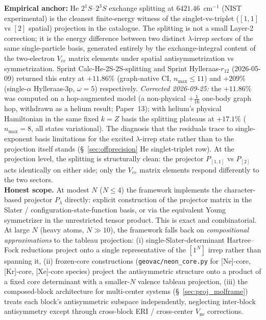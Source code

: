 \documentclass[11pt]{article}
\begin{document}
\textbf{Empirical anchor:} He $2^1 S$--$2^3 S$ exchange splitting at
$6421.46$~cm$^{-1}$ (NIST experimental) is the cleanest finite-energy
witness of the singlet-vs-triplet ($[1,1]$ vs $[2]$ spatial)
projection in the catalogue.  The splitting is not a small Layer-2
correction; it is the energy difference between two distinct
$\lambda$-irrep sectors of the same single-particle basis, generated
entirely by the exchange-integral content of the two-electron $V_{ee}$
matrix elements under spatial antisymmetrization vs symmetrization.
Sprint Calc-He-2S-2S-splitting and Sprint Hylleraas-$r_{12}$
(2026-05-09) returned this entry at $+11.86\%$ (graph-native CI,
$n_{\max} \leq 11$) and $+209\%$ (single-$\alpha$ Hylleraas-3p,
$\omega = 5$) respectively.  \emph{Corrected 2026-09-25:} the
$+11.86\%$ was computed on a hop-augmented model (a non-physical
$+\tfrac{1}{16}$ one-body graph hop, withdrawn as a helium result;
Paper~13); with helium's physical Hamiltonian in the same fixed
$k = Z$ basis the splitting plateaus at $+17.1\%$ ($n_{\max} = 8$,
all states variational).  The diagnosis that the residuals
trace to single-exponent basis limitations for the excited
$\lambda$-irrep state rather than to the projection itself stands
(\S~\ref{sec:offprecision} He singlet-triplet row).  At the
projection level, the splitting is structurally clean: the projector
$P_{[1,1]}$ vs $P_{[2]}$ acts identically on either side; only the
$V_{ee}$ matrix elements respond differently to the two sectors.\\
\textbf{Honest scope.}  At modest $N$ ($N \leq 4$) the framework
implements the character-based projector $P_\lambda$ directly:
explicit construction of the projector matrix in the Slater /
configuration-state-function basis, or via the equivalent Young
symmetrizer in the unrestricted tensor product.  This is exact and
combinatorial.  At large $N$ (heavy atoms, $N \gg 10$), the framework
falls back on \emph{compositional approximations} to the tableau
projection: (i) single-Slater-determinant Hartree--Fock reductions
project onto a single representative of the $[1^N]$ irrep rather
than spanning it, (ii) frozen-core constructions
(\texttt{geovac/neon\_core.py} for [Ne]-core, [Kr]-core, [Xe]-core
species) project the antisymmetric structure onto a product of a
fixed core determinant with a smaller-$N$ valence tableau projection,
(iii) the composed-block architecture for multi-center systems
(\S~\ref{sec:proj_molframe}) treats each block's antisymmetric
subspace independently, neglecting inter-block antisymmetry except
through cross-block ERI / cross-center $V_\text{ne}$ corrections.
\end{document}
